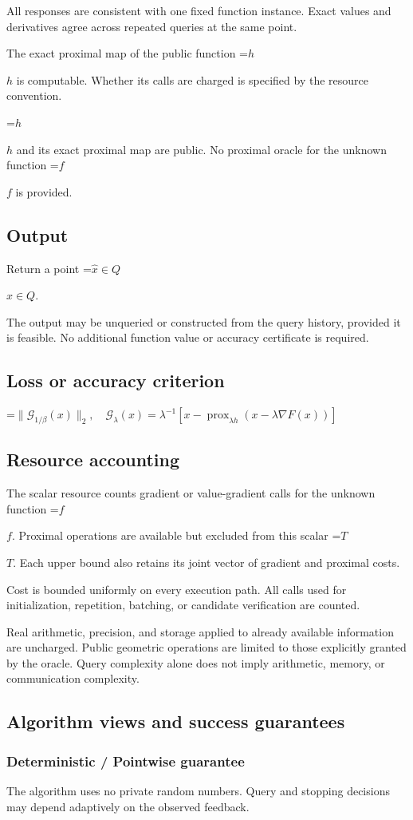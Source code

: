 \documentclass[10pt,a4paper]{article}
\newcommand{\AtlasMath}[1]{\par\begingroup\centering\setbox0=\hbox{$\displaystyle #1$}\ifdim\wd0>1.4\linewidth\typeout{ATLAS WIDE FORMULA: \the\wd0}\fi\ifdim\wd0>\linewidth\resizebox{\linewidth}{!}{\box0}\else\box0\fi\par\endgroup}
\newcommand{\AtlasInlineMath}[1]{\begingroup\setbox0=\hbox{$#1$}\ifdim\wd0>.4\linewidth\endgroup\AtlasMath{#1}\else\endgroup$#1$\fi}
\begin{document}
All responses are consistent with one fixed function instance. Exact values and derivatives agree across repeated queries at the same point.

The exact proximal map of the public function \AtlasInlineMath{h} is computable. Whether its calls are charged is specified by the resource convention.

\AtlasInlineMath{h} and its exact proximal map are public. No proximal oracle for the unknown function \AtlasInlineMath{f} is provided.

\subsection{Output}
Return a point \AtlasInlineMath{\widehat x\in Q}.

The output may be unqueried or constructed from the query history, provided it is feasible. No additional function value or accuracy certificate is required.

\subsection{Loss or accuracy criterion}

\AtlasMath{\|\mathcal{G}_{1/\beta}(x)\|_2,\quad\mathcal{G}_\lambda(x)=\lambda^{-1}[x-\operatorname{prox}_{\lambda h}(x-\lambda\nabla F(x))]}


\subsection{Resource accounting}
The scalar resource counts gradient or value-gradient calls for the unknown function \AtlasInlineMath{f}. Proximal operations are available but excluded from this scalar \AtlasInlineMath{T}. Each upper bound also retains its joint vector of gradient and proximal costs.

Cost is bounded uniformly on every execution path. All calls used for initialization, repetition, batching, or candidate verification are counted.

Real arithmetic, precision, and storage applied to already available information are uncharged. Public geometric operations are limited to those explicitly granted by the oracle. Query complexity alone does not imply arithmetic, memory, or communication complexity.

\subsection{Algorithm views and success guarantees}
\subsubsection{Deterministic / Pointwise guarantee}
The algorithm uses no private random numbers. Query and stopping decisions may depend adaptively on the observed feedback.
\end{document}
